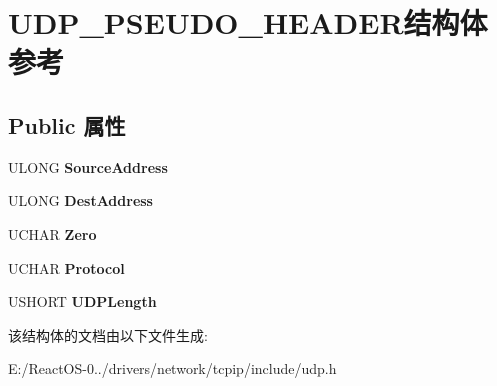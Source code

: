 \hypertarget{struct_u_d_p___p_s_e_u_d_o___h_e_a_d_e_r}{}\section{U\+D\+P\+\_\+\+P\+S\+E\+U\+D\+O\+\_\+\+H\+E\+A\+D\+E\+R结构体 参考}
\label{struct_u_d_p___p_s_e_u_d_o___h_e_a_d_e_r}
\subsection*{Public 属性}
\begin{DoxyCompactItemize}
\item 
\mbox{\label{struct_u_d_p___p_s_e_u_d_o___h_e_a_d_e_r_ae4d7582c26c143ea02b8cfc6deca67fd}} 
U\+L\+O\+NG {\bfseries Source\+Address}
\item 
\mbox{\label{struct_u_d_p___p_s_e_u_d_o___h_e_a_d_e_r_a28354f1a89d93fb88dd65c7a0d07cb9e}} 
U\+L\+O\+NG {\bfseries Dest\+Address}
\item 
\mbox{\label{struct_u_d_p___p_s_e_u_d_o___h_e_a_d_e_r_a3972d84fb95abb90113a4841cde78372}} 
U\+C\+H\+AR {\bfseries Zero}
\item 
\mbox{\label{struct_u_d_p___p_s_e_u_d_o___h_e_a_d_e_r_a70f89f9b8e66c322f8efa770a998c020}} 
U\+C\+H\+AR {\bfseries Protocol}
\item 
\mbox{\label{struct_u_d_p___p_s_e_u_d_o___h_e_a_d_e_r_ac7b603e59b40130e0814cff016913679}} 
U\+S\+H\+O\+RT {\bfseries U\+D\+P\+Length}
\end{DoxyCompactItemize}


该结构体的文档由以下文件生成\+:\begin{DoxyCompactItemize}
\item 
E\+:/\+React\+O\+S-\/0../drivers/network/tcpip/include/udp.\+h\end{DoxyCompactItemize}
